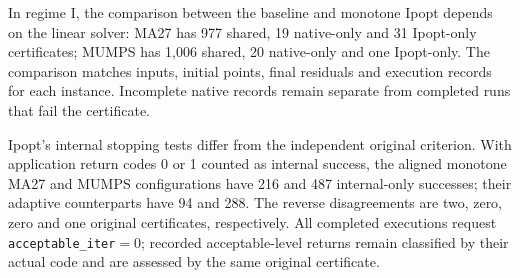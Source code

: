 \documentclass[pdflatex,sn-mathphys-num]{sn-jnl}
\theoremstyle{thmstyleone}
\theoremstyle{thmstylethree}
\newenvironment{scaledtable}[1][tbp]{\begin{tableorg}[#1]\centering}{\end{tableorg}}
\begin{document}
\begin{scaledtable}[!htbp]
\centering\footnotesize
\caption{Native original objectives relative to monotone Ipopt in M.
Signed symmetric gaps and quartiles are in percent on each complete
common-certificate cohort. ASU contains 503 planned cases; its complement
contains 294.}
\label{tab:aligned-M-objective-distributions}
\end{scaledtable}

In regime I, the comparison between the baseline and monotone Ipopt depends on the linear solver:
MA27 has 977 shared, 19 native-only and 31 Ipopt-only certificates;
MUMPS has 1,006 shared, 20 native-only and one Ipopt-only. The comparison matches
inputs, initial points, final residuals and execution records for each
instance. Incomplete native records remain separate from completed runs
that fail the certificate.

Ipopt's internal stopping tests differ from the independent original
criterion. With application return
codes 0 or 1 counted as internal success, the aligned monotone MA27 and
MUMPS configurations have 216 and 487 internal-only successes; their
adaptive counterparts have 94 and 288. The reverse disagreements are
two, zero, zero and one original certificates, respectively. All completed
executions request \texttt{acceptable\_iter}$=0$; recorded acceptable-level
returns remain classified by their actual code and are assessed by the
same original certificate.
\end{document}
